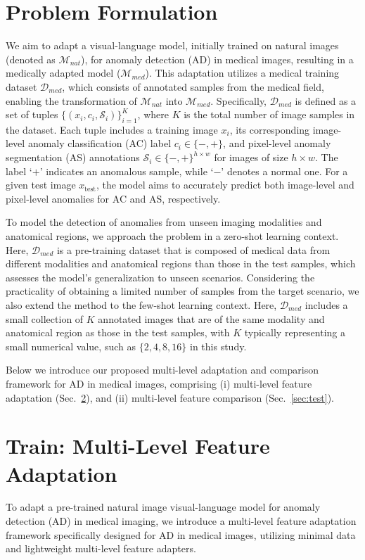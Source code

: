 \section{Problem Formulation}

We aim to adapt a visual-language model, initially trained on natural images (denoted as $\mathcal{M}_{nat}$), for anomaly detection (AD) in medical images, resulting in a medically adapted model ($\mathcal{M}_{med}$). This adaptation utilizes a medical training dataset $\mathcal{D}_{med}$, which consists of annotated samples from the medical field, enabling the transformation of $\mathcal{M}_{nat}$ into $\mathcal{M}_{med}$. Specifically, $\mathcal{D}_{med}$ is defined as a set of tuples $\{(x_i,c_i,\mathcal{S}_i)\}_{i=1}^{K}$, where $K$ is the total number of image samples in the dataset. Each tuple includes a training image $x_i$, its corresponding image-level anomaly classification (AC) label $c_i \in \{-, +\}$, and pixel-level anomaly segmentation (AS) annotations $\mathcal{S}_i\in \{-, +\}^{h\times w}$ for images of size $h\times w$. The label ‘$+$’ indicates an anomalous sample, while ‘$-$’ denotes a normal one. For a given test image $x_{\text{test}}$, the model aims to accurately predict both image-level and pixel-level anomalies for AC and AS, respectively.

To model the detection of anomalies from unseen imaging modalities and anatomical regions, we approach the problem in a zero-shot learning context. Here, $\mathcal{D}_{med}$ is a pre-training dataset that is composed of medical data from different modalities and anatomical regions than those in the test samples, which assesses the model's generalization to unseen scenarios. Considering the practicality of obtaining a limited number of samples from the target scenario, we also extend the method to the few-shot learning context. Here, $\mathcal{D}_{med}$ includes a small collection of $K$ annotated images that are of the same modality and anatomical region as those in the test samples, with $K$ typically representing a small numerical value, such as $\{2,4,8,16\}$ in this study.

Below we introduce our proposed multi-level adaptation and comparison framework for AD in medical images, comprising (i) multi-level feature adaptation (Sec.~\ref{sec:train}), and (ii) multi-level feature comparison (Sec.~\ref{sec:test}).

\section{Train: Multi-Level Feature Adaptation}
\label{sec:train}
To adapt a pre-trained natural image visual-language model for anomaly detection (AD) in medical imaging, we introduce a multi-level feature adaptation framework specifically designed for AD in medical images, utilizing minimal data and lightweight multi-level feature adapters.

